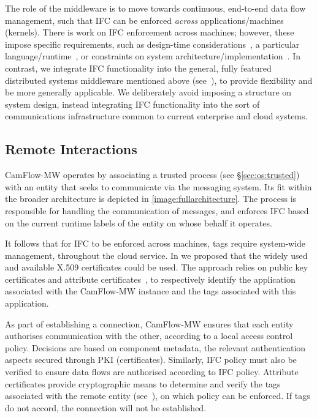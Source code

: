 \documentclass[10pt,journal,compsoc]{IEEEtran}
\begin{document}
The role of the middleware is to move towards continuous, end-to-end data flow management, such that IFC can be enforced {\em across} applications\slash machines (kernels).  
There 
is work on IFC enforcement across machines; however, these impose specific requirements, such as design-time considerations~\cite{sfaxi:CPE:CPE2807}, a particular language\slash runtime~\cite{yoshihama}, or  constraints on system architecture\slash implementation~\cite{cheng12:_abstr_usabl_infor_flow_contr_aeolus}. 
In contrast, we integrate IFC functionality into the general, fully featured distributed systems middleware mentioned above (see~\cite{singh2014ic2e}), to provide flexibility and be more generally applicable. 
We deliberately avoid imposing a structure on system design, instead integrating IFC functionality into the sort of communications infrastructure common to current enterprise and cloud systems. 



\subsection{Remote Interactions}
\label{sec:tags:represent}

CamFlow-MW operates by associating a trusted process (see \S\ref{sec:os:trusted}) with an entity that seeks to communicate via the messaging system. Its fit within the broader architecture is depicted in \fig\ref{image:fullarchitecture}.
The process is responsible for handling the communication of messages, and enforces IFC based on the current runtime labels of the entity on whose behalf it operates. 





It follows that  for IFC to be enforced across machines, tags require system-wide management, \ie throughout the cloud service. 
In \cite{singh2015riot} we proposed that the widely used and available X.509 certificates could be used.
The approach relies on public key certificates and attribute certificates~\cite{park2000binding}, 
to respectively identify the application associated with the CamFlow-MW instance and the tags associated with this application.






As part of establishing a connection, CamFlow-MW ensures that each entity authorises communication with the other, according to a local access control policy. Decisions are based on component metadata, the relevant authentication aspects secured through PKI (certificates).
Similarly, IFC policy must also be verified to ensure data flows are authorised according to IFC policy.
Attribute certificates provide cryptographic means to determine and verify the tags associated with the remote entity (see~\cite{singh2015riot}), on which policy can be enforced. If tags do not accord, the connection will not be established.
\end{document}
